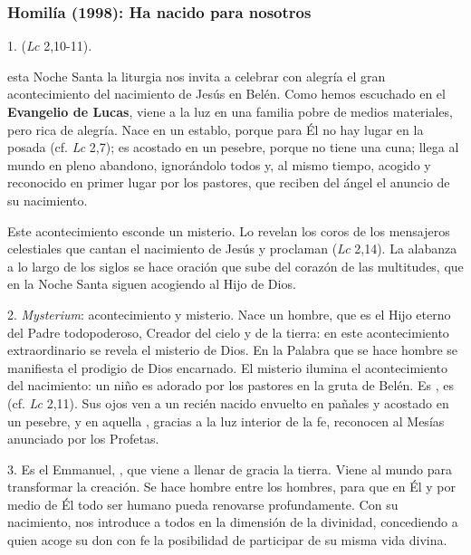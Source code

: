 \subsubsection{Homilía (1998): Ha nacido para nosotros}


\begin{body}
	
	1.  (\emph{Lc} 2,10-11).
	
	 esta Noche Santa la liturgia nos invita a celebrar con alegría el gran acontecimiento del nacimiento de Jesús en Belén. Como hemos escuchado en el \textbf{Evangelio de Lucas}, viene a la luz en una familia pobre de medios materiales, pero rica de alegría. Nace en un establo, porque para Él no hay lugar en la posada (cf. \emph{Lc} 2,7); es acostado en un pesebre, porque no tiene una cuna; llega al mundo en pleno abandono, ignorándolo todos y, al mismo tiempo, acogido y reconocido en primer lugar por los pastores, que reciben del ángel el anuncio de su nacimiento.
	
	Este acontecimiento esconde un misterio. Lo revelan los coros de los mensajeros celestiales que cantan el nacimiento de Jesús y proclaman  (\emph{Lc} 2,14). La alabanza a lo largo de los siglos se hace oración que sube del corazón de las multitudes, que en la Noche Santa siguen acogiendo al Hijo de Dios.
	
	2. \emph{Mysterium}: acontecimiento y misterio. Nace un hombre, que es el Hijo eterno del Padre todopoderoso, Creador del cielo y de la tierra: en este acontecimiento extraordinario se revela el misterio de Dios. En la Palabra que se hace hombre se manifiesta el prodigio de Dios encarnado. El misterio ilumina el acontecimiento del nacimiento: un niño es adorado por los pastores en la gruta de Belén. Es , es  (cf. \emph{Lc} 2,11). Sus ojos ven a un recién nacido envuelto en pañales y acostado en un pesebre, y en aquella , gracias a la luz interior de la fe, reconocen al Mesías anunciado por los Profetas.
	
	3. Es el Emmanuel, , que viene a llenar de gracia la tierra. Viene al mundo para transformar la creación. Se hace hombre entre los hombres, para que en Él y por medio de Él todo ser humano pueda renovarse profundamente. Con su nacimiento, nos introduce a todos en la dimensión de la divinidad, concediendo a quien acoge su don con fe la posibilidad de participar de su misma vida divina.
	

\end{body}
